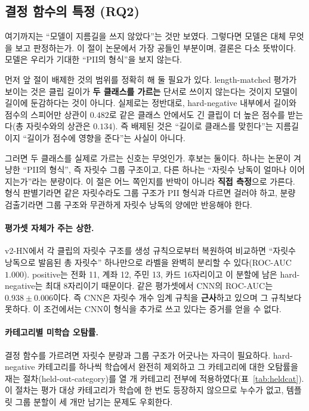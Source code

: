 \documentclass[10pt,twocolumn]{article}
\renewcommand{\emph}[1]{\textbf{#1}}
\begin{document}
\subsection{결정 함수의 특정 (RQ2)}\label{sec:exp:decision}
여기까지는 ``모델이 지름길을 쓰지 않았다''는 것만 보였다. 그렇다면 모델은 대체 무엇을 보고
판정하는가. 이 절이 논문에서 가장 공들인 부분이며, 결론은 다소 뜻밖이다. 모델은 우리가 기대한
``PII의 형식''을 보지 않는다.

먼저 앞 절이 배제한 것의 범위를 정확히 해 둘 필요가 있다. length-matched 평가가 보이는 것은
클립 길이가 \emph{두 클래스를 가르는} 단서로 쓰이지 않는다는 것이지 모델이 길이에 둔감하다는
것이 아니다. 실제로는 정반대로, hard-negative 내부에서 길이와 점수의 스피어만 상관이 $0.482$로
같은 클래스 안에서도 긴 클립이 더 높은 점수를 받는다(총 자릿수와의 상관은 $0.134$). 즉 배제된
것은 ``길이로 클래스를 맞힌다''는 지름길이지 ``길이가 점수에 영향을 준다''는 사실이 아니다.

그러면 두 클래스를 실제로 가르는 신호는 무엇인가. 후보는 둘이다. 하나는 논문이 겨냥한 ``PII의
형식'', 즉 자릿수 그룹 구조이고, 다른 하나는 ``자릿수 낭독이 얼마나 이어지는가''라는 분량이다.
이 절은 어느 쪽인지를 반박이 아니라 \emph{직접 측정}으로 가른다. 형식 판별기라면 같은
자릿수라도 그룹 구조가 PII 형식과 다르면 걸러야 하고, 분량 검출기라면 그룹 구조와 무관하게
자릿수 낭독의 양에만 반응해야 한다.

\paragraph{평가셋 자체가 주는 상한.}
v2-HN에서 각 클립의 자릿수 구조를 생성 규칙으로부터 복원하여 비교하면 ``자릿수 낭독으로
발음된 총 자릿수'' 하나만으로 라벨을 완벽히 분리할 수 있다(ROC-AUC $1.000$). positive는 전화
11, 계좌 12, 주민 13, 카드 16자리이고 이 분할에 남은 hard-negative는 최대 8자리이기 때문이다.
같은 평가셋에서 CNN의 ROC-AUC는 $0.938\pm0.006$이다. 즉 CNN은 자릿수 개수 임계 규칙을
\emph{근사}하고 있으며 그 규칙보다 못하다. 이 조건에서는 CNN이 형식을 추가로 쓰고 있다는 증거를
얻을 수 없다.

\paragraph{카테고리별 미학습 오탐률.}
결정 함수를 가르려면 자릿수 분량과 그룹 구조가 어긋나는 자극이 필요하다. hard-negative
카테고리를 하나씩 학습에서 완전히 제외하고 그 카테고리에 대한 오탐률을 재는
절차(held-out-category)를 열 개 카테고리 전부에 적용하였다(표~\ref{tab:heldcat}). 이 절차는
평가 대상 카테고리가 학습에 한 번도 등장하지 않으므로 누수가 없고, 템플릿 그룹 분할이 세 개만
남기는 문제도 우회한다.
\end{document}
